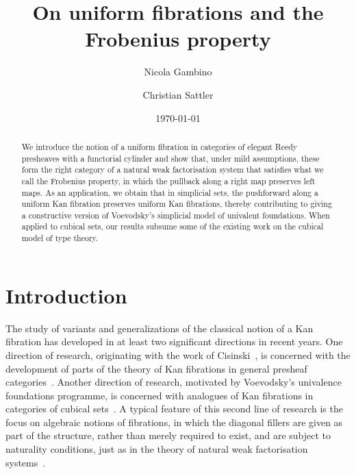 \documentclass[reqno,10pt,a4paper,oneside]{amsart}
\title[Uniform fibrations]{On uniform fibrations and
the Frobenius property}
\begin{document}
\begin{abstract}
We introduce the notion of a uniform fibration in categories of elegant Reedy presheaves
with a functorial cylinder 
and show that, under mild assumptions, these form the right category of a natural weak
factorisation system that satisfies what we call the Frobenius property, \ie in which the
pullback along a right map preserves left maps. As an application, we obtain that in
simplicial sets,  the pushforward along a uniform Kan
fibration preserves uniform Kan fibrations, thereby contributing to giving a constructive
version of Voevodsky's simplicial model of univalent foundations. When applied
to cubical sets, our results  subsume some of the existing work on the cubical
model of type theory.
\end{abstract}

\author{Nicola Gambino}
\address{School of Mathematics, University of Leeds, Leeds LS2 9JT, UK}

\author{Christian Sattler}
\address{School of Mathematics, University of Leeds, Leeds LS2 9JT, UK}

\date{\today}

\maketitle



\section*{Introduction}

The study of variants and generalizations of the classical notion of a Kan fibration has developed
in at least two significant directions in recent years. One direction of research, originating with the work of
Cisinski~\cite{cisinski-asterisque}, is concerned with the development of  parts of the theory of Kan fibrations in
general presheaf categories~\cite{cisinski-univalence,moerdijk-minimal}.  Another direction of
research, motivated by Voevodsky's univalence foundations programme, is concerned with 
analogues of Kan fibrations in categories of cubical sets~\cite{awodey-cubical,coquand-cubical-sets,coquand-variation,huber-thesis,pitts-cubical-nominal,swan-awfs}. A typical feature of this second line of research is  the focus on algebraic notions of fibrations, in which the diagonal fillers are given as part of the structure, rather than merely required to
exist, and are subject to naturality conditions, just as 
in the theory of natural weak factorisation 
systems~\cite{grandis-tholen-nwfs}.
\end{document}
